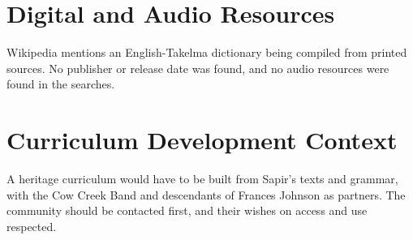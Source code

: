 \documentclass[12pt]{article}
\begin{document}
\section{Digital and Audio Resources}
Wikipedia mentions an English-Takelma dictionary being compiled from printed sources. No publisher or release date was found, and no audio resources were found in the searches.

\section{Curriculum Development Context}
A heritage curriculum would have to be built from Sapir's texts and grammar, with the Cow Creek Band and descendants of Frances Johnson as partners. The community should be contacted first, and their wishes on access and use respected.
\end{document}
